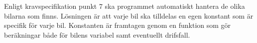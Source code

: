 Enligt kravspecifikation punkt 7 ska programmet automatiskt hantera de olika bilarna som finns. Lösningen är att varje bil ska tilldelas en egen konstant som är specifik för varje bil. Konstanten är framtagen genom en funktion som gör beräkningar både för bilens variabel samt eventuellt drifsfall. 
